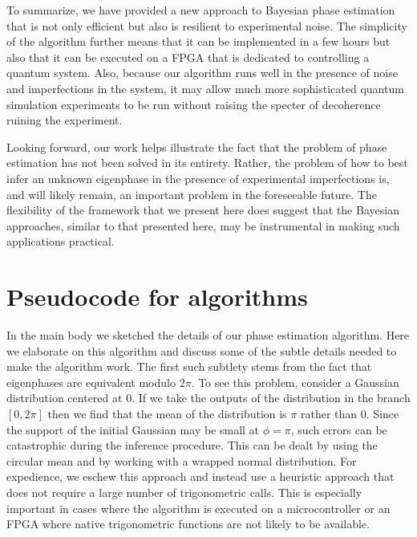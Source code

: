 \documentclass[aps,pra,amsmath,twocolumn,amssymb,superscriptaddress]{revtex4-1}
\begin{document}
To summarize, we have provided a new approach to Bayesian phase estimation that is not only efficient but also is resilient to experimental noise.  The simplicity of the algorithm further means that it can be implemented in a few hours but also that it can be executed on a FPGA that is dedicated to controlling a quantum system. Also, because our algorithm runs well in the presence of noise and imperfections in the system, it may allow much more sophisticated quantum simulation experiments to be run without raising the specter of decoherence ruining the experiment.  

Looking forward, our work helps illustrate the fact that the problem of phase estimation has not been solved in its entirety.  Rather, the problem of how to best infer an unknown eigenphase in the presence of experimental imperfections is, and will likely remain, an important problem in the foreseeable future.  The flexibility of the framework that we present here does suggest that the Bayesian approaches, similar to that presented here, may be instrumental in making such applications practical.
% 

\pagebreak
\appendix
\onecolumngrid
\section{Pseudocode for algorithms}
In the main body we sketched the details of our phase estimation algorithm.  Here we elaborate on this algorithm and discuss some of the
subtle details needed to make the algorithm work.  The first such subtlety stems from the fact that eigenphases are equivalent modulo $2\pi$.  
To see this problem, consider a Gaussian distribution centered at $0$.  If we take the outputs of the distribution in the branch $[0,2\pi]$ then we find that the mean of the distribution is $\pi$ rather than $0$.  Since the support of the initial Gaussian may be small at $\phi=\pi$, such errors can be catastrophic during the inference procedure.  This can be dealt by using the circular mean and by working with a wrapped normal distribution.  For expedience, we eschew this approach and instead use a heuristic approach that does  not require a large number of trigonometric calls.  This is especially important in cases where the algorithm is executed on a microcontroller or an FPGA where native trigonometric functions are not likely to be available.
\end{document}

